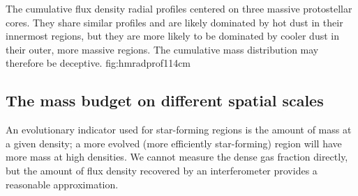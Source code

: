 \documentclass{aa}
\begin{document}

{The cumulative flux density radial profiles centered on three
massive protostellar cores.  They share similar profiles and
are likely dominated by hot dust in their innermost regions,
but they are more likely to be dominated by cooler dust in their
outer, more massive regions.  The cumulative mass distribution may
therefore be deceptive.}
{fig:hmradprof}{1}{14cm}

% 
% 

\subsection{The mass budget on different spatial scales}
\label{sec:massbudget}
An evolutionary indicator used for star-forming regions is the amount of mass
at a given density; a more evolved (more efficiently star-forming) region will
have more mass at high densities.  We cannot measure the dense gas fraction
directly, but the amount of flux density recovered by an interferometer
provides a reasonable approximation.
\end{document}
